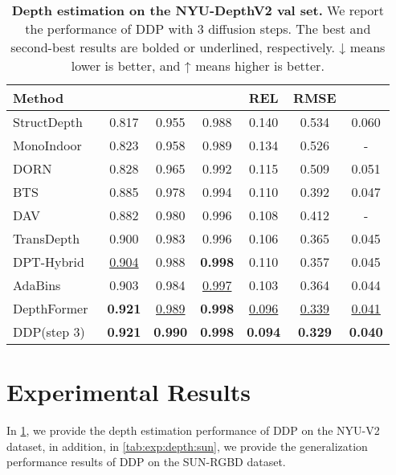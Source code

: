 \documentclass[10pt,twocolumn,letterpaper]{article}
\newcommand{\ours}[0]{DDP\xspace}
\begin{document}
\begin{table}[t!]
\centering
\footnotesize
\setlength{\tabcolsep}{1.25mm}
\begin{tabular}{l|ccc|ccc}
Method &  &  &  & REL  & RMSE  &   \\
\hline 
StructDepth~\cite{li2021structdepth} & 0.817 & 0.955 & 0.988 & 0.140 & 0.534 & 0.060  \\
MonoIndoor~\cite{ji2021monoindoor} & 0.823 & 0.958 & 0.989 & 0.134 & 0.526 & -  \\
DORN~\cite{fu2018deep} & 0.828 & 0.965 & 0.992 & 0.115 & 0.509 & 0.051  \\
BTS~\cite{lee2019big} & 0.885 & 0.978 & 0.994 & 0.110 & 0.392 & 0.047  \\
DAV~\cite{huynh2020guiding} & 0.882 & 0.980 & 0.996 & 0.108 & 0.412 & -  \\
TransDepth~\cite{yang2021transformer} & 0.900 & 0.983 & 0.996 & 0.106 & 0.365 & 0.045  \\
DPT-Hybrid~\cite{ranftl2021vision} & \underline{0.904} & 0.988 & \textbf{0.998} & 0.110 & 0.357 & 0.045  \\
AdaBins~\cite{bhat2021adabins} & 0.903 & 0.984 & \underline{0.997} & 0.103 & 0.364 & 0.044  \\
DepthFormer~\cite{li2022depthformer} &  \textbf{0.921} & \underline{0.989} & \textbf{0.998} & \underline{0.096} & \underline{0.339} & \underline{0.041}  \\
\rowcolor{gray!10} 
\ours (step 3) & \textbf{0.921} & \textbf{0.990} & \textbf{0.998} &\textbf{0.094} & \textbf{0.329} & \textbf{0.040}   \\ 
\end{tabular}
\vspace{0.5em}
\caption{\textbf{Depth estimation on the NYU-DepthV2 val set.}
We report the performance of \ours with 3 diffusion steps.
The best and second-best results are bolded or underlined, respectively. ↓ means lower is better, and ↑ means higher is better.}
\label{tab:exp:depth:nyu}
\end{table}

\section{Experimental Results}
In \cref{tab:exp:depth:nyu}, we provide the depth estimation performance of DDP on the NYU-V2 dataset, in addition, in \cref{tab:exp:depth:sun}, we provide the generalization performance results of DDP on the SUN-RGBD dataset.

\label{supp:experiment}
\end{document}
